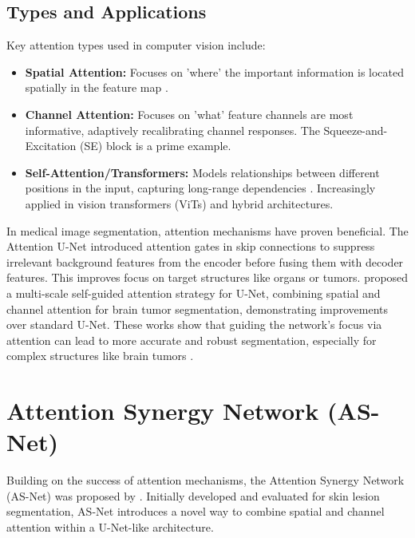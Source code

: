 \subsection{Types and Applications}
Key attention types used in computer vision include:
\begin{itemize}
  \item \textbf{Spatial Attention:} Focuses on 'where' the important information is located spatially in the feature map \parencite{jetley2018learn}.
  \item \textbf{Channel Attention:} Focuses on 'what' feature channels are most informative, adaptively recalibrating channel responses. The Squeeze-and-Excitation (SE) block \parencite{hu2018squeeze} is a prime example.
  \item \textbf{Self-Attention/Transformers:} Models relationships between different positions in the input, capturing long-range dependencies \parencite{vaswani2017attention}. Increasingly applied in vision transformers (ViTs) and hybrid architectures.
\end{itemize}

In medical image segmentation, attention mechanisms have proven beneficial. The Attention U-Net \parencite{oktay2018attention} introduced attention gates in skip connections to suppress irrelevant background features from the encoder before fusing them with decoder features. This improves focus on target structures like organs or tumors. \textcite{sinha2020multi} proposed a multi-scale self-guided attention strategy for U-Net, combining spatial and channel attention for brain tumor segmentation, demonstrating improvements over standard U-Net. These works show that guiding the network's focus via attention can lead to more accurate and robust segmentation, especially for complex structures like brain tumors \parencite{ranjbarzadeh2021brain}.

\section{Attention Synergy Network (AS-Net)}

Building on the success of attention mechanisms, the Attention Synergy Network (AS-Net) was proposed by \textcite{hu2022asnet}. Initially developed and evaluated for skin lesion segmentation, AS-Net introduces a novel way to combine spatial and channel attention within a U-Net-like architecture.

